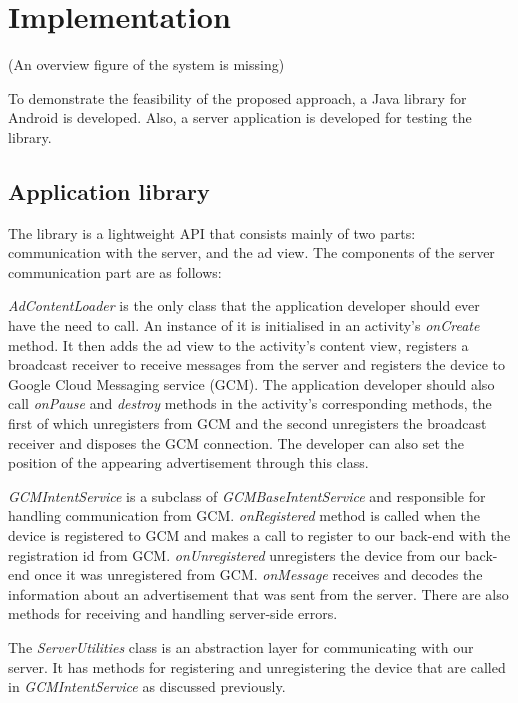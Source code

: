 \chapter{Implementation}


(An overview figure of the system is missing)


To demonstrate the feasibility of the proposed approach, a Java library for Android is developed. Also, a server application is developed for testing the library.

\section{Application library}

The library is a lightweight API that consists mainly of two parts: communication with the server,  and the ad view. The components of the server communication part are as follows:

\textit{AdContentLoader} is the only class that the application developer should ever have the need to call. An instance of it is initialised in an activity's \textit{onCreate} method. It then adds the ad view to the activity's content view, registers a broadcast receiver to receive messages from the server and registers the device to Google Cloud Messaging service (GCM).\cite{notifications:gcm} The application developer should also call \textit{onPause} and \textit{destroy} methods in the activity's corresponding methods, the first of which unregisters from GCM and the second unregisters the broadcast receiver and disposes the GCM connection. The developer can also set the position of the appearing advertisement through this class.

\textit{GCMIntentService} is a subclass of \textit{GCMBaseIntentService} and responsible for handling communication from GCM. \textit{onRegistered} method is called when the device is registered to GCM and makes a call to register to our back-end with the registration id from GCM. \textit{onUnregistered} unregisters the device from our back-end once it was unregistered from GCM. \textit{onMessage} receives and decodes the information about an advertisement that was sent from the server. There are also methods for receiving and handling server-side errors.

The \textit{ServerUtilities} class is an abstraction layer for communicating with our server. It has methods for registering and unregistering the device that are called in \textit{GCMIntentService} as discussed previously.

